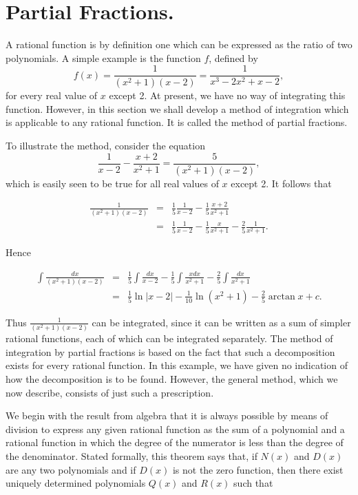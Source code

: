 \section{Partial Fractions.}
A rational function is by definition one which can be expressed as the ratio
of two polynomials. A simple example is the function $f$, defined by
$$
f(x) = \frac{1}{(x^2 + 1)(x - 2)} =   \frac{1}{x^3 - 2x^2 + x - 2},
$$
\noindent for every real value of $x$ except 2. At present, we have no way of integrating this function. However, in this section we shall develop a method of integration which is applicable to any rational function. It is called the method of partial fractions.

To illustrate the method, consider the equation
$$
\frac{1}{x - 2} - \frac{x + 2}{x^2 + 1} = \frac{5}{(x^2 + 1)(x - 2)},
$$
\noindent which is easily seen to be true for all real values of $x$
except 2. It follows that

\begin{eqnarray*}
\frac{1}{(x^2 + 1)(x - 2)} 
&=& \frac{1}{5} \frac{1}{x - 2} - \frac{1}{5} \frac{x + 2}{x^2 + 1}\\
&=& \frac{1}{5} \frac{1}{x - 2} - \frac{1}{5} \frac{x}{x^2 + 1} - \frac{2}{5} \frac{1}{x^2 + 1}. 
\end{eqnarray*}

\noindent Hence

\begin{eqnarray*}
\int \frac{dx}{(x^2 + 1)(x - 2)} 
&=& \frac{1}{5} \int \frac{dx}{x - 2} - \frac{1}{5} \int \frac{x dx}{x^2 + 1} - \frac{2}{5} \int \frac{dx}{x^2 + 1}\\
&=& \frac{1}{5} \ln |x - 2| - \frac{1}{10} \ln(x^2 + 1) - \frac{2}{5} \arctan x + c.  
\end{eqnarray*}

\noindent Thus $\frac{1}{(x^2 + 1)(x -2)}$ can be integrated, since it can be written as a sum of simpler rational functions, each of which can be integrated separately. The method of integration by partial fractions is based on the fact that such a decomposition exists for every rational function. In this example, we have given no indication of how the decomposition is to be found. However, the general method, which we now describe, consists of just such a prescription.

We begin with the result from algebra that it is always possible by means
of division to express any given rational function as the sum of a polynomial
and a rational function in which the degree of the numerator is less than the degree of the denominator. Stated formally, this theorem says that, if $N(x)$ and $D(x)$ are any two polynomials and if $D(x)$ is not the zero function, then there exist uniquely determined polynomials $Q(x)$ and $R(x)$ such that 

